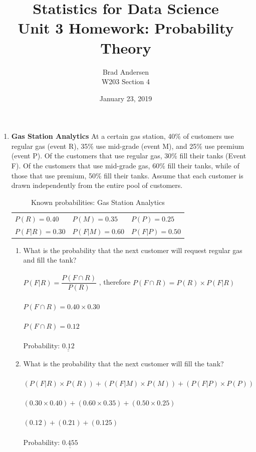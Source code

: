 \documentclass[12pt,a4paper]{article}
\title{Statistics for Data Science \\
    Unit 3 Homework: Probability Theory}
\author{Brad Andersen \\
    W203 Section 4}
\date{January 23, 2019}
\numberwithin{equation}{subsection}
\def\doubleunderline#1{\underline{\underline{#1}}}
\begin{document}
\maketitle

\begin{enumerate}


\item \textbf{Gas Station Analytics}
At a certain gas station, 40\% of customers use regular gas (event R), 35\% use mid-grade (event M), and 25\% use premium (event P).  Of the customers that use regular gas, 30\% fill their tanks (Event F).  Of the customers that use mid-grade gas, 60\% fill their tanks, while of those that use premium, 50\% fill their tanks.  Assume that each customer is drawn independently from the entire pool of customers.

\begin{table}[h]
\centering
\begin{tabular}{lll}
    $P(R) = 0.40$ & $P(M) = 0.35$ & $P(P) = 0.25$ \\
    $P(F|R) = 0.30$ & $P(F|M) = 0.60$ & $P(F|P) = 0.50$ \\
\end{tabular}
\caption{Known probabilities: Gas Station Analytics}
\end{table}

\begin{enumerate}
\item What is the probability that the next customer will request regular gas and fill the tank? \\ \\
$P(F|R) = \dfrac{P(F \cap R)}{P(R)}$ , therefore $P(F \cap R) = P(R) \times P(F|R)$ \\ \\
$P(F \cap R) = 0.40 \times 0.30$ \\ \\
$P(F \cap R) = 0.12$ \\ \\
Probability: $\doubleunderline{0.12}$ \\

\item What is the probability that the next customer will fill the tank? \\ \\
$(P(F|R) \times P(R)) + (P(F|M) \times P(M)) + (P(F|P) \times P(P))$ \\ \\
$(0.30 \times 0.40) + (0.60 \times 0.35) + (0.50 \times 0.25)$ \\ \\
$(0.12) + (0.21) + (0.125)$ \\ \\
Probability: $\doubleunderline{0.455}$ \\


\end{enumerate}
\end{enumerate}
\end{document}
